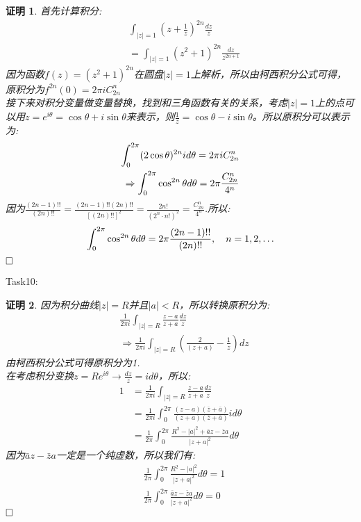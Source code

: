 \documentclass{ctexart}
\newcommand{\。}{．} %
\newenvironment{lanse}{
    \begin{tcolorbox}[breakable,enhanced, colback=qlan, boxrule=0pt, frame hidden,
        borderline west={0.7mm}{0.1mm}{slan}]
    }
    {\end{tcolorbox}}
\theoremstyle{t} %
\newtheorem*{zmhj}{\color{slan} 证明}
\newenvironment{zm}{\begin{lanse}\begin{zmhj}}{$\hfill \square$\end{zmhj}\end{lanse}}
\begin{document}
\begin{zm}
    首先计算积分:
    \begin{align*}
        &\int_{|z|=1}\left(z+\frac{1}{z}\right)^{2n}\frac{dz}{z}\\
        &=\int_{|z|=1}\left(z^{2}+1\right)^{2n}\frac{dz}{z^{2n+1}}
    \end{align*}
    因为函数$f(z)=(z^{2}+1)^{2n}$在圆盘$|z|=1$上解析，所以由柯西积分公式可得，原积分为$f^{2n}(0)=2\pi iC_{2n}^{n}$\\
    接下来对积分变量做变量替换，找到和三角函数有关的关系，考虑$|z|=1$上的点可以用$z=e^{i\theta}=\cos\theta+i\sin\theta$来表示，则$\frac{1}{z}=\cos\theta-i\sin\theta$。所以原积分可以表示为:
    \begin{align*}
        \int_{0}^{2\pi}(2\cos\theta)^{2n}id\theta=2\pi iC_{2n}^{n}\\
        \Rightarrow \int_{0}^{2\pi}\cos^{2n}\theta\space d\theta=2\pi \frac{C_{2n}^{n}}{4^n}
    \end{align*}
    因为$\frac{(2n-1)!!}{(2n)!!}=\frac{(2n-1)!!(2n)!!}{[(2n)!!]^2}=\frac{2n!}{(2^n\cdot n!)^2}=\frac{C_{2n}^{n}}{4^n}$.所以:
    \begin{align*}
        \int_{0}^{2\pi}\cos^{2n}\theta\space d\theta=2\pi \frac{(2n-1)!!}{(2n)!!},\quad n=1,2,\dots
    \end{align*}
\end{zm}
Task10:
\begin{zm}
    因为积分曲线$|z|=R$并且$|a|<R$，所以转换原积分为:
    \begin{align*}
        &\frac{1}{2\pi i}\int_{|z|=R}\frac{z-a}{z+a}\frac{dz}{z}\\
        &\Rightarrow \frac{1}{2\pi i}\int_{|z|=R}\left(\frac{2}{(z+a)}-\frac{1}{z}\right)dz
    \end{align*}
    由柯西积分公式可得原积分为1.\\
    在考虑积分变换$z=Re^{i\theta}\rightarrow \frac{dz}{z}=id\theta$，所以:
    \begin{align*}
        1&=\frac{1}{2\pi i}\int_{|z|=R}\frac{z-a}{z+a}\frac{dz}{z}\\
        &=\frac{1}{2\pi i}\int_{0}^{2\pi}\frac{(z-a)(\bar{z}+\bar{a})}{(z+a)(\bar{z}+\bar{a})}id\theta\\
        &=\frac{1}{2\pi}\int_{0}^{2\pi}\frac{R^2-|a|^2+\bar{a}z-\bar{z}a}{|z+a|^2}d\theta
    \end{align*}
    因为$\bar{a}z-\bar{z}a$一定是一个纯虚数，所以我们有:
    \begin{align*}
        &\frac{1}{2\pi}\int_{0}^{2\pi}\frac{R^2-|a|^2}{|z+a|^2}d\theta=1\\
        &\frac{1}{2\pi}\int_{0}^{2\pi}\frac{\bar{a}z-\bar{z}a}{|z+a|^2}d\theta=0
    \end{align*}
\end{zm}
\end{document}

